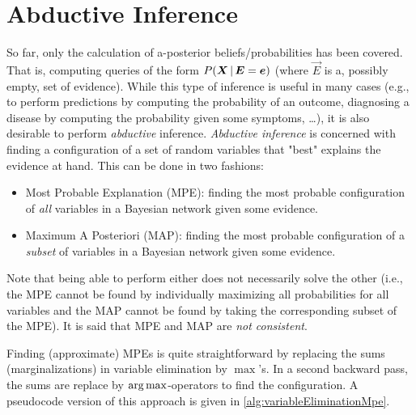 	\section{Abductive Inference}
		So far, only the calculation of a-posterior beliefs/probabilities has been covered. That is, computing queries of the form \( P(\bm{X} \,\vert\, \bm{E} = \bm{e}) \) (where \(\vec{E}\) is a, possibly empty, set of evidence). While this type of inference is useful in many cases (e.g., to perform predictions by computing the probability of an outcome, diagnosing a disease by computing the probability given some symptoms, \dots), it is also desirable to perform \emph{abductive} inference. \emph{Abductive inference} is concerned with finding a configuration of a set of random variables that "best" explains the evidence at hand. This can be done in two fashions:
		\begin{itemize}
			\item Most Probable Explanation (MPE): finding the most probable configuration of \emph{all} variables in a Bayesian network given some evidence.
			\item Maximum A Posteriori (MAP): finding the most probable configuration of a \emph{subset} of variables in a Bayesian network given some evidence.
		\end{itemize}
		Note that being able to perform either does not necessarily solve the other (i.e., the MPE cannot be found by individually maximizing all probabilities for all variables and the MAP cannot be found by taking the corresponding subset of the MPE). It is said that MPE and MAP are \emph{not consistent}.

		Finding (approximate) MPEs is quite straightforward by replacing the sums (marginalizations) in variable elimination by \(\max\)'s. In a second backward pass, the sums are replace by \(\operatorname*{arg\,max}\)-operators to find the configuration. A pseudocode version of this approach is given in \autoref{alg:variableEliminationMpe}.

